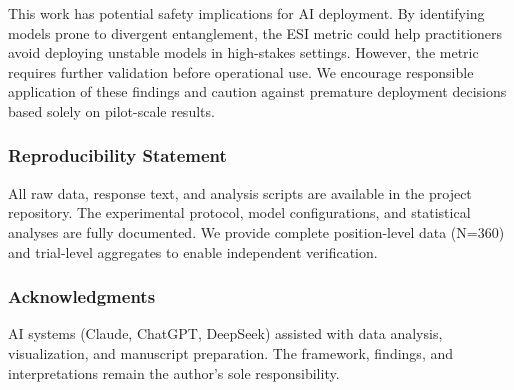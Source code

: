 \documentclass[11pt]{article}
\begin{document}
This work has potential safety implications for AI deployment. By identifying models prone to divergent entanglement, the ESI metric could help practitioners avoid deploying unstable models in high-stakes settings. However, the metric requires further validation before operational use. We encourage responsible application of these findings and caution against premature deployment decisions based solely on pilot-scale results.

\subsubsection*{Reproducibility Statement}

All raw data, response text, and analysis scripts are available in the project repository. The experimental protocol, model configurations, and statistical analyses are fully documented. We provide complete position-level data (N=360) and trial-level aggregates to enable independent verification.

\subsubsection*{Acknowledgments}

AI systems (Claude, ChatGPT, DeepSeek) assisted with data analysis, visualization, and manuscript preparation. The framework, findings, and interpretations remain the author's sole responsibility.



\end{document}
